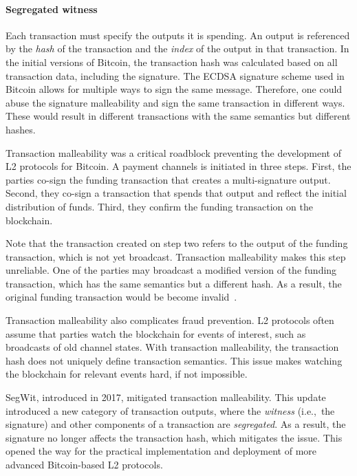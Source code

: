 \paragraph{Segregated witness}

Each transaction must specify the outputs it is spending.
An output is referenced by the \textit{hash} of the transaction and the \textit{index} of the output in that transaction.
In the initial versions of Bitcoin, the transaction hash was calculated based on all transaction data, including the signature.
The ECDSA signature scheme used in Bitcoin allows for multiple ways to sign the same message.
Therefore, one could abuse the signature malleability and sign the same transaction in different ways.
These would result in different transactions with the same semantics but different hashes.

Transaction malleability was a critical roadblock preventing the development of L2 protocols for Bitcoin.
A payment channels is initiated in three steps.
First, the parties co-sign the funding transaction that creates a multi-signature output.
Second, they co-sign a transaction that spends that output and reflect the initial distribution of funds.
Third, they confirm the funding transaction on the blockchain.

Note that the transaction created on step two refers to the output of the funding transaction, which is not yet broadcast.
Transaction malleability makes this step unreliable.
One of the parties may broadcast a modified version of the funding transaction, which has the same semantics but a different hash.
As a result, the original funding transaction would be become invalid~\cite{Harding2016}.

Transaction malleability also complicates fraud prevention.
L2 protocols often assume that parties watch the blockchain for events of interest, such as broadcasts of old channel states.
With transaction malleability, the transaction hash does not uniquely define transaction semantics.
This issue makes watching the blockchain for relevant events hard, if not impossible.

SegWit, introduced in 2017, mitigated transaction malleability.
This update introduced a new category of transaction outputs, where the \textit{witness} (i.e.,~the signature) and other components of a transaction are \textit{segregated}.
As a result, the signature no longer affects the transaction hash, which mitigates the issue.
This opened the way for the practical implementation and deployment of more advanced Bitcoin-based L2 protocols.


